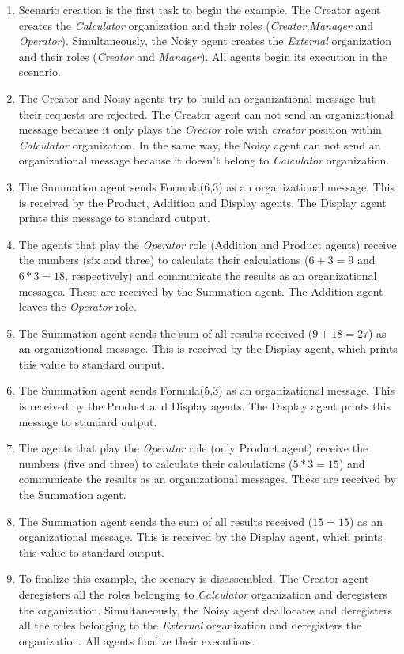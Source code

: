 \begin{enumerate}
\item Scenario creation is the first task to begin the example. The Creator agent creates the \textit{Calculator}   organization and their roles (\textit{Creator},\textit{Manager} and \textit{Operator}). Simultaneously,   the Noisy agent creates the \textit{External} organization and their roles (\textit{Creator} and \textit{Manager}). All agents begin its execution in the scenario.
\item The Creator and Noisy agents try to build an organizational message but their requests are rejected.   The Creator agent can not send an organizational message because it only plays the \textit{Creator}
  role with \textit{creator} position within \textit{Calculator} organization. In the same way, the Noisy
  agent can not send an organizational message because it doesn't belong to \textit{Calculator} organization.
\item The Summation agent sends Formula(6,3) as an organizational message. This is received by the Product,
  Addition and Display agents. The Display agent prints this message to standard output.
\item The agents that play the \textit{Operator} role (Addition and Product agents) receive the numbers
  (six and three) to calculate their calculations ($6+3=9$ and $6*3=18$, respectively) and communicate
  the results as an organizational messages. These are received by the Summation agent. The Addition agent
  leaves the \textit{Operator} role.
\item The Summation agent sends the sum of all results received ($9+18=27$) as an organizational message.
  This is received by the Display agent, which prints this value to standard output.
\item The Summation agent sends Formula(5,3) as an organizational message. This is received by the Product
  and Display agents. The Display agent prints this message to standard output.
\item The agents that play the \textit{Operator} role (only Product agent) receive the numbers (five and three)
  to calculate their calculations ($5*3=15$) and communicate the results as an organizational messages. These
  are received by the Summation agent.
\item The Summation agent sends the sum of all results received ($15=15$) as an organizational message. This
  is received by the Display agent, which prints this value to standard output.
\item To finalize this example, the scenary is disassembled. The Creator agent deregisters all the roles belonging to \textit{Calculator} organization and deregisters the organization. Simultaneously,
  the Noisy agent deallocates and deregisters all the roles belonging to the \textit{External} organization and
  deregisters the organization. All agents finalize their executions.
\end{enumerate}

